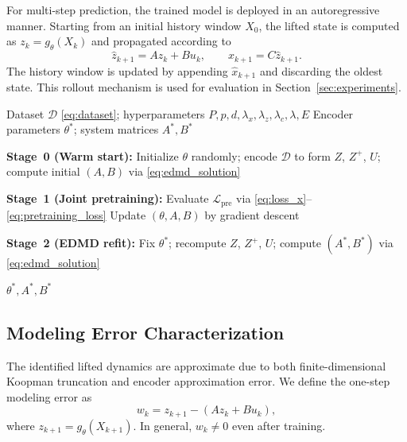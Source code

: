 \documentclass[journal]{IEEEtran}
\begin{document}
For multi-step prediction, the trained model is deployed in an autoregressive manner. Starting from an initial history window $X_0$, the lifted state is computed as $z_k = g_\theta(X_k)$ and propagated according to
\begin{equation}
    \hat{z}_{k+1} = A z_k + B u_k, \qquad
    \hat{x}_{k+1} = C \hat{z}_{k+1}.
\end{equation}
The history window is updated by appending $\hat{x}_{k+1}$ and discarding the oldest state. This rollout mechanism is used for evaluation in Section~\ref{sec:experiments}.

\begin{algorithm}[!t]
\caption{Transformer-Koopman Training Pipeline}
\label{alg:training}
\begin{algorithmic}[1]
\REQUIRE Dataset $\mathcal{D}$ \eqref{eq:dataset}; 
         hyperparameters $P,p,d,\lambda_x,\lambda_z,\lambda_c,\lambda,E$
\ENSURE  Encoder parameters $\theta^{*}$; system matrices $A^{*},B^{*}$

\STATE \textbf{Stage~0 (Warm start):}
       Initialize $\theta$ randomly; encode $\mathcal{D}$ to form 
       $Z$, $Z^{+}$, $U$; compute initial $(A,B)$ via 
       \eqref{eq:edmd_solution}

\STATE \textbf{Stage~1 (Joint pretraining):}
        \STATE Evaluate $\mathcal{L}_{\mathrm{pre}}$ via 
               \eqref{eq:loss_x}--\eqref{eq:pretraining_loss}
        \STATE Update $(\theta, A, B)$ by gradient descent
    \ENDFOR
\ENDFOR

\STATE \textbf{Stage~2 (EDMD refit):}
       Fix $\theta^{*}$; recompute $Z$, $Z^{+}$, $U$; 
       compute $(A^{*},B^{*})$ via \eqref{eq:edmd_solution}

\RETURN $\theta^{*}, A^{*}, B^{*}$
\end{algorithmic}
\end{algorithm}

\subsection{Modeling Error Characterization}
\label{subsec:modeling_error}

The identified lifted dynamics are approximate due to both finite-dimensional Koopman truncation and encoder approximation error. We define the one-step modeling error as
\begin{equation}
    w_k = z_{k+1} - (A z_k + B u_k),
    \label{eq:modeling_error}
\end{equation}
where $z_{k+1} = g_\theta(X_{k+1})$. In general, $w_k \neq 0$ even after training.
\end{document}
